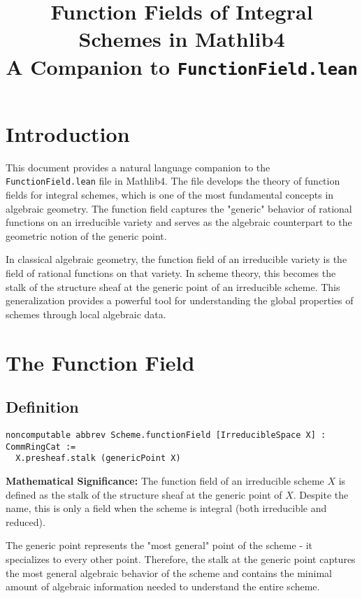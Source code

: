 \documentclass{article}
\title{Function Fields of Integral Schemes in Mathlib4\\
\large A Companion to \texttt{FunctionField.lean}}
\author{}
\date{}
\theoremstyle{definition}
\begin{document}
\maketitle

\section{Introduction}

This document provides a natural language companion to the \texttt{FunctionField.lean} file in Mathlib4. The file develops the theory of function fields for integral schemes, which is one of the most fundamental concepts in algebraic geometry. The function field captures the "generic" behavior of rational functions on an irreducible variety and serves as the algebraic counterpart to the geometric notion of the generic point.

In classical algebraic geometry, the function field of an irreducible variety is the field of rational functions on that variety. In scheme theory, this becomes the stalk of the structure sheaf at the generic point of an irreducible scheme. This generalization provides a powerful tool for understanding the global properties of schemes through local algebraic data.

\section{The Function Field}

\subsection{Definition}

\begin{lstlisting}
noncomputable abbrev Scheme.functionField [IrreducibleSpace X] : CommRingCat :=
  X.presheaf.stalk (genericPoint X)
\end{lstlisting}

\textbf{Mathematical Significance:} The function field of an irreducible scheme $X$ is defined as the stalk of the structure sheaf at the generic point of $X$. Despite the name, this is only a field when the scheme is integral (both irreducible and reduced).

The generic point represents the "most general" point of the scheme - it specializes to every other point. Therefore, the stalk at the generic point captures the most general algebraic behavior of the scheme and contains the minimal amount of algebraic information needed to understand the entire scheme.
\end{document}
